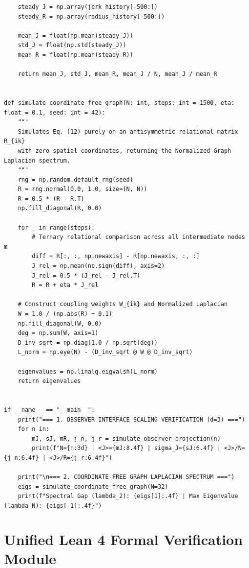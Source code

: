 \documentclass[11pt,a4paper]{article}
\theoremstyle{plain}
\theoremstyle{definition}
\theoremstyle{remark}
\begin{document}
\begin{lstlisting}
    steady_J = np.array(jerk_history[-500:])
    steady_R = np.array(radius_history[-500:])
    
    mean_J = float(np.mean(steady_J))
    std_J = float(np.std(steady_J))
    mean_R = float(np.mean(steady_R))
    
    return mean_J, std_J, mean_R, mean_J / N, mean_J / mean_R


def simulate_coordinate_free_graph(N: int, steps: int = 1500, eta: float = 0.1, seed: int = 42):
    """
    Simulates Eq. (12) purely on an antisymmetric relational matrix R_{ik}
    with zero spatial coordinates, returning the Normalized Graph Laplacian spectrum.
    """
    rng = np.random.default_rng(seed)
    R = rng.normal(0.0, 1.0, size=(N, N))
    R = 0.5 * (R - R.T)
    np.fill_diagonal(R, 0.0)
    
    for _ in range(steps):
        # Ternary relational comparison across all intermediate nodes m
        diff = R[:, :, np.newaxis] - R[np.newaxis, :, :]
        J_rel = np.mean(np.sign(diff), axis=2)
        J_rel = 0.5 * (J_rel - J_rel.T)
        R = R + eta * J_rel
        
    # Construct coupling weights W_{ik} and Normalized Laplacian
    W = 1.0 / (np.abs(R) + 0.1)
    np.fill_diagonal(W, 0.0)
    deg = np.sum(W, axis=1)
    D_inv_sqrt = np.diag(1.0 / np.sqrt(deg))
    L_norm = np.eye(N) - (D_inv_sqrt @ W @ D_inv_sqrt)
    
    eigenvalues = np.linalg.eigvalsh(L_norm)
    return eigenvalues


if __name__ == "__main__":
    print("=== 1. OBSERVER INTERFACE SCALING VERIFICATION (d=3) ===")
    for n in:
        mJ, sJ, mR, j_n, j_r = simulate_observer_projection(n)
        print(f"N={n:3d} | <J>={mJ:8.4f} | sigma_J={sJ:6.4f} | <J>/N={j_n:6.4f} | <J>/R={j_r:6.4f}")
        
    print("\n=== 2. COORDINATE-FREE GRAPH LAPLACIAN SPECTRUM ===")
    eigs = simulate_coordinate_free_graph(N=32)
    print(f"Spectral Gap (lambda_2): {eigs[1]:.4f} | Max Eigenvalue (lambda_N): {eigs[-1]:.4f}")
\end{lstlisting}

\section{Unified Lean 4 Formal Verification Module}
\label{app:lean_unified}
\end{document}
